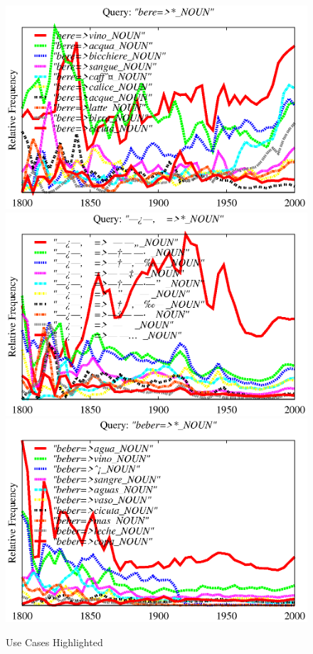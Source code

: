 \documentclass[11pt]{article}
\begin{document}
\begin{figure}
{\includegraphics[width=.48\textwidth]{graphs/drink_ITA}
\includegraphics[width=.48\textwidth]{graphs/drink_RUS}
\includegraphics[width=.48\textwidth]{graphs/drink_SPA}}
\caption{\label{fig:examples}
Use Cases Highlighted}
\end{figure}
\end{document}
